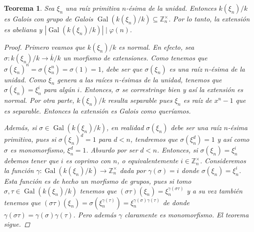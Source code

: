 \documentclass[12pt]{book}
\newtheorem{teo}{Teorema}[section]
\theoremstyle{definition}
\newcommand{\ZZ}{\mathbb{Z}}      %
\DeclareMathOperator{\Gal}{Gal}
\begin{document}
\begin{teo}
Sea $\xi_n$ una raíz primitiva $n$-ésima de la unidad. Entonces $k(\xi_n)/k$ es Galois con grupo de Galois $\Gal(k(\xi_n)/k)\subseteq\ZZ_n^\times$. Por lo tanto, la extensión es abeliana y $|\Gal(k(\xi_n)/k)|\mid \varphi(n)$.
\begin{proof}
Primero veamos que $k(\xi_n)/k$ es normal. En efecto, sea $\sigma:k(\xi_n)/k\to\overline{k}/k$ un morfismo de extensiones. Como tenemos que $\sigma(\xi_n)^n = \sigma(\xi_n^n) = \sigma(1)=1$, debe ser que $\sigma(\xi_n)$ es una raíz $n$-ésima de la unidad. Como $\xi_n$ genera a las raíces $n$-ésimas de la unidad, tenemos que $\sigma(\xi_n)=\xi_n^i$ para algún $i$. Entonces, $\sigma$ se correstringe bien y así la extensión es normal. Por otra parte, $k(\xi_n)/k$ resulta separable pues $\xi_n$ es raíz de $x^n - 1$ que es separable. Entonces la extensión es Galois como queríamos.

Además, si $\sigma\in\Gal(k(\xi_n)/k)$, en realidad $\sigma(\xi_n)$ debe ser una raíz $n$-ésima primitiva, pues si $\sigma(\xi_n)^d =1$ para $d<n$, tendremos que $\sigma(\xi_n^d) = 1$ y así como $\sigma$ es monomorfismo, $\xi_n^d = 1$. Absurdo por ser $d<n$. Entonces, si $\sigma(\xi_n)=\xi_n^i$ debemos tener que $i$ es coprimo con $n$, o equivalentemente $i\in\ZZ_n^\times$. Consideremos la función $\gamma:\Gal(k(\xi_n)/k)\to \ZZ_n^\times$ dada por $\gamma(\sigma) = i$ donde $\sigma(\xi_n)=\xi_n^i$. Esta función es de hecho un morfismo de grupos, pues si tomo $\sigma,\tau\in\Gal(k(\xi_n)/k)$ tenemos que $(\sigma\tau)(\xi_n) = \xi_n^{\gamma(\sigma\tau)}$ y a su vez también tenemos que $(\sigma\tau)(\xi_n) = \sigma(\xi_n^{\gamma(\tau)}) = \xi_n^{\gamma(\sigma)\gamma(\tau)}$ de donde $\gamma(\sigma\tau)=\gamma(\sigma)\gamma(\tau)$. Pero además $\gamma$ claramente es monomorfismo. El teorema sigue.
\end{proof}
\end{teo}
\end{document}
